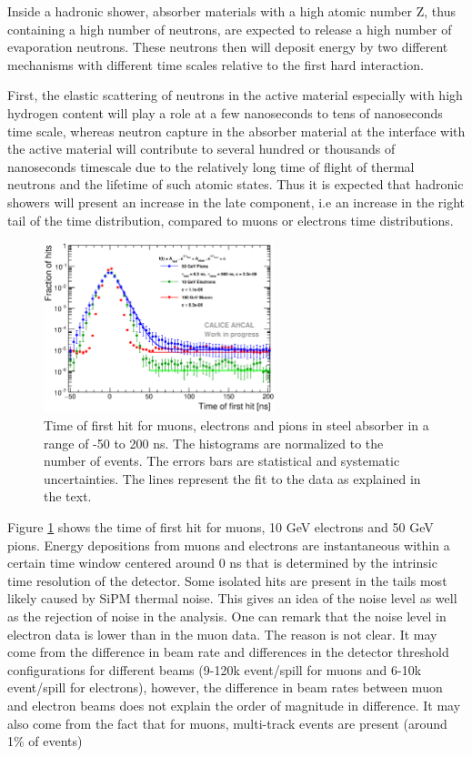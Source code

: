 Inside a hadronic shower, absorber materials with a high atomic number Z, thus containing a high number of neutrons, are expected to release a high number of evaporation neutrons. These neutrons then will deposit energy by two different mechanisms with different time scales relative to the first hard interaction.

First, the elastic scattering of neutrons in the active material especially with high hydrogen content will play a role at a few nanoseconds to tens of nanoseconds time scale, whereas neutron capture in the absorber material at the interface with the active material will contribute to several hundred or thousands of nanoseconds timescale due to the relatively long time of flight of thermal neutrons and the lifetime of such atomic states. Thus it is expected that hadronic showers will present an increase in the late component, i.e an increase in the right tail of the time distribution, compared to muons or electrons time distributions.

\begin{figure}[htbp!]
	\centering
	\includegraphics[width=0.6\textwidth]{../Thesis_Plots/Timing/Pions/Plots/Timing_dNdt_Comparison.eps}
	\caption{Time of first hit for muons, electrons and pions in steel absorber in a range of -50 to 200 ns. The histograms are normalized to the number of events. The errors bars are statistical and systematic uncertainties. The lines represent the fit to the data as explained in the text.}
	\label{fig:dNdt_Comparison}
\end{figure}

Figure \ref{fig:dNdt_Comparison} shows the time of first hit for muons, 10 GeV electrons and 50 GeV pions. Energy depositions from muons and electrons are instantaneous within a certain time window centered around 0 ns that is determined by the intrinsic time resolution of the detector. Some isolated hits are present in the tails most likely caused by SiPM thermal noise. This gives an idea of the noise level as well as the rejection of noise in the analysis. One can remark that the noise level in electron data is lower than in the muon data. The reason is not clear. It may come from the difference in beam rate and differences in the detector threshold configurations for different beams (9-120k event/spill for muons and 6-10k event/spill for electrons), however, the difference in beam rates between muon and electron beams does not explain the order of magnitude in difference. It may also come from the fact that for muons, multi-track events are present (around 1\% of events)

